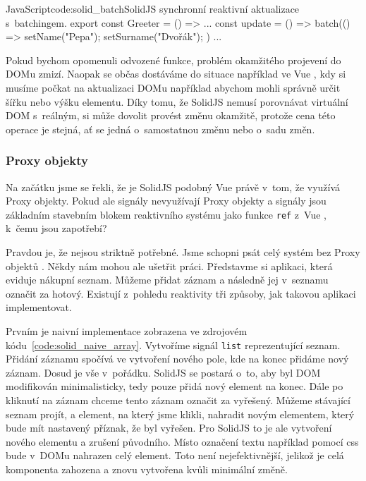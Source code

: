 \documentclass[
  master,
  program=ainf,
  tables=false,
  sourcecodes,
  glossaries,
  index
]{kidiplom}
\begin{document}
  \begin{kicode}{JavaScript}{code:solid_batch}{SolidJS synchronní reaktivní aktualizace s~batchingem.}
    export const Greeter = () => {
      ...
      const update = () => batch(() => {
        setName("Pepa");
        setSurname("Dvořák");
        })
        ...
        }
      \end{kicode}

Pokud bychom opomenuli odvozené funkce, problém okamžitého projevení do DOMu zmizí. Naopak se občas
dostáváme do situace například ve Vue \cite{vue}, kdy si musíme počkat na aktualizaci DOMu například abychom mohli
správně určit šířku nebo výšku elementu. Díky tomu, že SolidJS \cite{solidjs} nemusí porovnávat virtuální DOM s~reálným,
si může dovolit provést změnu okamžitě, protože cena této operace je stejná, ať se jedná o~samostatnou změnu
nebo o~sadu změn. 
    
\subsubsection{Proxy objekty}
Na začátku jsme se řekli, že je SolidJS \cite{solidjs} podobný Vue \cite{vue} právě v~tom, že využívá Proxy objekty. Pokud ale
signály nevyužívají Proxy objekty \cite{proxy} a signály jsou základním stavebním blokem reaktivního systému jako
funkce {\tt ref} z~Vue \cite{vue}, k~čemu jsou zapotřebí?

Pravdou je, že nejsou striktně potřebné. Jsme schopni psát celý systém bez Proxy objektů \cite{proxy}.
Někdy nám mohou ale ušetřit práci. Představme si aplikaci, která eviduje nákupní seznam. Můžeme přidat
záznam a následně jej v~seznamu označit za hotový. Existují z~pohledu reaktivity tři způsoby, jak takovou 
aplikaci implementovat.

Prvním je naivní implementace zobrazena ve zdrojovém kódu~\ref{code:solid_naive_array}. Vytvoříme signál {\tt list}
reprezentující seznam. Přidání záznamu spočívá ve 
vytvoření nového pole, kde na konec přidáme nový záznam. Dosud je vše v~pořádku. SolidJS \cite{solidjs} se postará o~to,
aby byl DOM modifikován minimalisticky, tedy pouze přidá nový element na konec. Dále po kliknutí na záznam
chceme tento záznam označit za vyřešený. Můžeme stávající seznam projít, a element, na který jsme klikli,
nahradit novým elementem, který bude mít nastavený příznak, že byl vyřešen. Pro SolidJS \cite{solidjs} to je ale vytvoření
nového elementu a zrušení původního. Místo označení textu například pomocí css bude v~DOMu nahrazen celý
element. Toto není nejefektivnější, jelikož je celá komponenta zahozena a znovu vytvořena kvůli minimální
změně.
\end{document}
